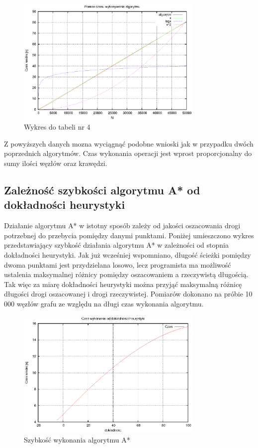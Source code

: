 \documentclass[a4paper,11pt]{article}
\begin{document}
\begin{enumerate}
    \begin{figure}[th]
\centering
\includegraphics[width=0.8\textwidth]{../prj/wykres16.eps}
\caption{Wykres do tabeli nr 4}
\label{Wykres do tabeli nr 4}
\end{figure} 
Z powyższych danych mozna wyciągnąć podobne wnioski jak w przypadku dwóch poprzednich algorytmów. Czas wykonania operacji jest wprost proporcjonalny do sumy ilości węzłów oraz krawędzi.

\subsection{Zależność szybkości algorytmu A* od dokładności heurystyki}

Działanie algorytmu A* w istotny sposób zależy od jakości oszacowania drogi potrzebnej do przebycia pomiędzy danymi punktami. Poniżej umieszczono 
wykres przedstawiający szybkość działania algorytmu A* w zależności od stopnia dokładności heurystyki. 
Jak już wcześniej wspomniano, długość ścieżki pomiędzy dwoma punktami jest przydzielana losowo, lecz programista ma możliwość ustalenia 
maksymalnej różnicy pomiędzy oszacowaniem a rzeczywistą długością. Tak więc za miarę dokładności heurystyki można przyjąć maksymalną różnicę długości 
drogi oszacowanej i drogi rzeczywistej. Pomiarów dokonano na próbie 10 000 węzłów grafu ze względu na długi czas wykonania algorytmu.

  \begin{figure}[th]
\centering
\includegraphics[width=0.8\textwidth]{../prj/wykres_a.eps}
\caption{Szybkość wykonania algorytmu A*}
\label{a_star}


\end{figure}
\end{enumerate}
\end{document}
